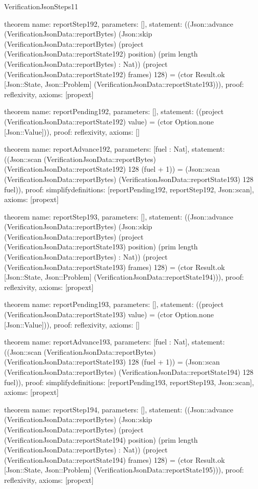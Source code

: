 \begin{lexlean}{VerificationJsonSteps11}
\begin{semanticmodule}
theorem{
  name: reportStep192,
  parameters: [],
  statement: ((Json::advance (VerificationJsonData::reportBytes) (Json::skip (VerificationJsonData::reportBytes) (project (VerificationJsonData::reportState192) position) (prim length (VerificationJsonData::reportBytes) : Nat)) (project (VerificationJsonData::reportState192) frames) 128) = (ctor Result.ok [Json::State, Json::Problem] (VerificationJsonData::reportState193))),
  proof: reflexivity{},
  axioms: [propext]
}

theorem{
  name: reportPending192,
  parameters: [],
  statement: ((project (VerificationJsonData::reportState192) value) = (ctor Option.none [Json::Value])),
  proof: reflexivity{},
  axioms: []
}

theorem{
  name: reportAdvance192,
  parameters: [fuel : Nat],
  statement: ((Json::scan (VerificationJsonData::reportBytes) (VerificationJsonData::reportState192) 128 (fuel + 1)) = (Json::scan (VerificationJsonData::reportBytes) (VerificationJsonData::reportState193) 128 fuel)),
  proof: simplify{definitions: [reportPending192, reportStep192, Json::scan]},
  axioms: [propext]
}

theorem{
  name: reportStep193,
  parameters: [],
  statement: ((Json::advance (VerificationJsonData::reportBytes) (Json::skip (VerificationJsonData::reportBytes) (project (VerificationJsonData::reportState193) position) (prim length (VerificationJsonData::reportBytes) : Nat)) (project (VerificationJsonData::reportState193) frames) 128) = (ctor Result.ok [Json::State, Json::Problem] (VerificationJsonData::reportState194))),
  proof: reflexivity{},
  axioms: [propext]
}

theorem{
  name: reportPending193,
  parameters: [],
  statement: ((project (VerificationJsonData::reportState193) value) = (ctor Option.none [Json::Value])),
  proof: reflexivity{},
  axioms: []
}

theorem{
  name: reportAdvance193,
  parameters: [fuel : Nat],
  statement: ((Json::scan (VerificationJsonData::reportBytes) (VerificationJsonData::reportState193) 128 (fuel + 1)) = (Json::scan (VerificationJsonData::reportBytes) (VerificationJsonData::reportState194) 128 fuel)),
  proof: simplify{definitions: [reportPending193, reportStep193, Json::scan]},
  axioms: [propext]
}

theorem{
  name: reportStep194,
  parameters: [],
  statement: ((Json::advance (VerificationJsonData::reportBytes) (Json::skip (VerificationJsonData::reportBytes) (project (VerificationJsonData::reportState194) position) (prim length (VerificationJsonData::reportBytes) : Nat)) (project (VerificationJsonData::reportState194) frames) 128) = (ctor Result.ok [Json::State, Json::Problem] (VerificationJsonData::reportState195))),
  proof: reflexivity{},
  axioms: [propext]
}


\end{semanticmodule}
\end{lexlean}
